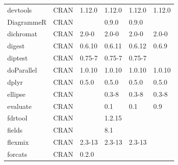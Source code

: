\begin{longtable}{llllll}
\rowcolor{black!10}
devtools                      & \acrshort{CRAN}                      & 1.12.0      & 1.12.0      & 1.12.0         & 1.12.0            \\
\rowcolor{black!5}
DiagrammeR                    & \acrshort{CRAN}                      &             & 0.9.0       & 0.9.0          &                    \\
\rowcolor{black!10}
dichromat                     & \acrshort{CRAN}                      & 2.0-0       & 2.0-0       & 2.0-0          & 2.0-0             \\
\rowcolor{black!5}
digest                        & \acrshort{CRAN}                      & 0.6.10      & 0.6.11      & 0.6.12         & 0.6.9              \\
\rowcolor{black!10}
diptest                       & \acrshort{CRAN}                      & 0.75-7      & 0.75-7      & 0.75-7         &                   \\
\rowcolor{black!5}
doParallel                    & \acrshort{CRAN}                      & 1.0.10      & 1.0.10      & 1.0.10         & 1.0.10             \\
\rowcolor{black!10}
dplyr                         & \acrshort{CRAN}                      & 0.5.0       & 0.5.0       & 0.5.0          & 0.5.0             \\
\rowcolor{black!5}
ellipse                       & \acrshort{CRAN}                      &             & 0.3-8       & 0.3-8          & 0.3-8              \\
\rowcolor{black!10}
evaluate                      & \acrshort{CRAN}                      &             & 0.1         & 0.1            & 0.9               \\
\rowcolor{black!5}
fdrtool                       & \acrshort{CRAN}                      &             & 1.2.15      &                &                    \\
\rowcolor{black!10}
fields                        & \acrshort{CRAN}                      &             & 8.1         &                &                   \\
\rowcolor{black!5}
flexmix                       & \acrshort{CRAN}                      & 2.3-13      & 2.3-13      & 2.3-13         &                    \\
\rowcolor{black!10}
forcats                       & \acrshort{CRAN}                      & 0.2.0       &             &                &                   \\

\end{longtable}
